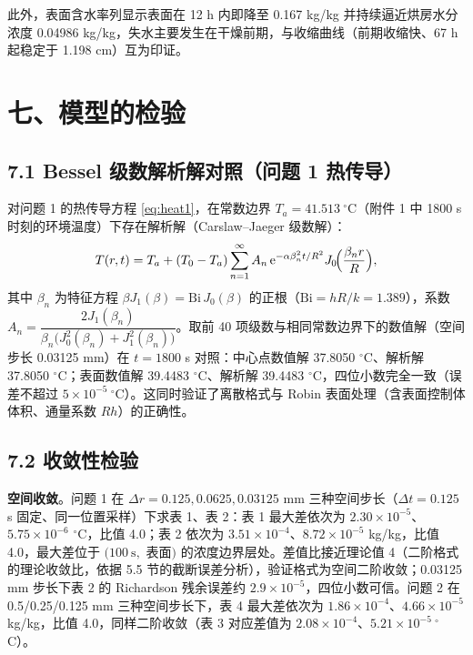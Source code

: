 \documentclass[12pt,a4paper]{ctexart}
\begin{document}
此外，表面含水率列显示表面在 12 h 内即降至 0.167 kg/kg 并持续逼近烘房水分浓度 0.04986 kg/kg，失水主要发生在干燥前期，与收缩曲线（前期收缩快、67 h 起稳定于 1.198 cm）互为印证。

\section{七、模型的检验}

\subsection{7.1 Bessel 级数解析解对照（问题 1 热传导）}

对问题 1 的热传导方程 \eqref{eq:heat1}，在常数边界 $T_a=41.513\ ^\circ$C（附件 1 中 1800 s 时刻的环境温度）下存在解析解（Carslaw--Jaeger 级数解\cite{carslaw}）：
\begin{equation}
T(r,t)=T_a+(T_0-T_a)\sum_{n=1}^{\infty}A_n\,\mathrm{e}^{-\alpha\beta_n^2 t/R^2}J_0\!\Bigl(\frac{\beta_n r}{R}\Bigr),
\label{eq:bessel}
\end{equation}
其中 $\beta_n$ 为特征方程 $\beta J_1(\beta)=\mathrm{Bi}\,J_0(\beta)$ 的正根（$\mathrm{Bi}=hR/k=1.389$），系数 $A_n=\dfrac{2J_1(\beta_n)}{\beta_n\bigl(J_0^2(\beta_n)+J_1^2(\beta_n)\bigr)}$。取前 40 项级数与相同常数边界下的数值解（空间步长 0.03125 mm）在 $t=1800$ s 对照：中心点数值解 37.8050 $^\circ$C、解析解 37.8050 $^\circ$C；表面数值解 39.4483 $^\circ$C、解析解 39.4483 $^\circ$C，四位小数完全一致（误差不超过 $5\times10^{-5}\ ^\circ$C）。这同时验证了离散格式与 Robin 表面处理（含表面控制体体积、通量系数 $Rh$）的正确性。

\subsection{7.2 收敛性检验}

\textbf{空间收敛}。问题 1 在 $\Delta r=0.125,0.0625,0.03125$ mm 三种空间步长（$\Delta t=0.125$ s 固定、同一位置采样）下求表 1、表 2：表 1 最大差依次为 $2.30\times10^{-5}$、$5.75\times10^{-6}$ $^\circ$C，比值 4.0；表 2 依次为 $3.51\times10^{-4}$、$8.72\times10^{-5}$ kg/kg，比值 4.0，最大差位于 $(100\ \mathrm{s},$ 表面$)$ 的浓度边界层处。差值比接近理论值 4（二阶格式的理论收敛比，依据 5.5 节的截断误差分析），验证格式为空间二阶收敛；0.03125 mm 步长下表 2 的 Richardson 残余误差约 $2.9\times10^{-5}$，四位小数可信。问题 2 在 0.5/0.25/0.125 mm 三种空间步长下，表 4 最大差依次为 $1.86\times10^{-4}$、$4.66\times10^{-5}$ kg/kg，比值 4.0，同样二阶收敛（表 3 对应差值为 $2.08\times10^{-4}$、$5.21\times10^{-5}\ ^\circ$C）。
\end{document}
